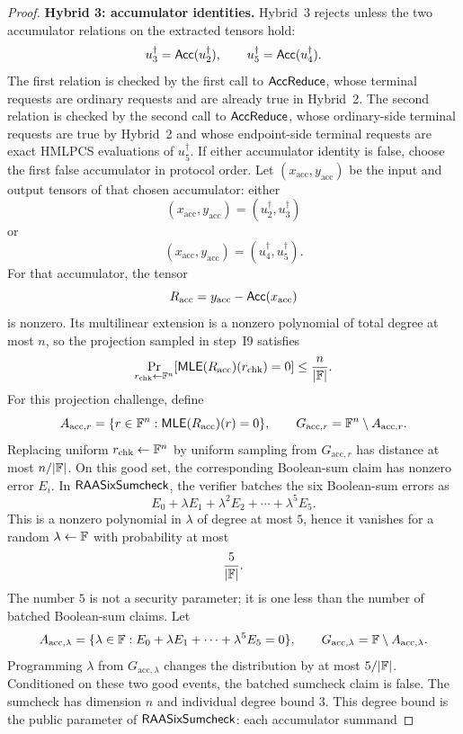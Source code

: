 \begin{proof}
\smallskip\noindent\textbf{Hybrid 3: accumulator identities.}
Hybrid~3 rejects unless the two accumulator relations on the extracted tensors
hold:
\[
  u_3^\dagger=\mathsf{Acc}(u_2^\dagger),
  \qquad
  u_5^\dagger=\mathsf{Acc}(u_4^\dagger).
\]
The first relation is checked by the first call to \(\mathsf{AccReduce}\), whose
terminal requests are ordinary requests and are already true in Hybrid~2.  The
second relation is checked by the second call to \(\mathsf{AccReduce}\), whose
ordinary-side terminal requests are true by Hybrid~2 and whose endpoint-side
terminal requests are exact HMLPCS evaluations of \(u_5^\dagger\).  If either
accumulator identity is false, choose the first false accumulator in protocol
order.  Let \((x_{\mathrm{acc}},y_{\mathrm{acc}})\) be the input and output
tensors of that chosen accumulator: either
\[
  (x_{\mathrm{acc}},y_{\mathrm{acc}})
  =
  (u_2^\dagger,u_3^\dagger)
\]
or
\[
  (x_{\mathrm{acc}},y_{\mathrm{acc}})
  =
  (u_4^\dagger,u_5^\dagger).
\]
For that accumulator, the tensor
\[
  R_{\mathrm{acc}}=y_{\mathrm{acc}}-\mathsf{Acc}(x_{\mathrm{acc}})
\]
is nonzero.  Its multilinear extension is a nonzero polynomial of total degree
at most \(n\), so the projection sampled in step~I9 satisfies
\[
  \Pr_{r_{\mathrm{chk}}\leftarrow\mathbb{F}^n}
  [\mathsf{MLE}(R_{\mathrm{acc}})(r_{\mathrm{chk}})=0]
  \le \frac{n}{|\mathbb{F}|}.
\]
For this projection challenge, define
\[
  A_{\mathrm{acc},r}
  =
  \{r\in\mathbb{F}^n:\mathsf{MLE}(R_{\mathrm{acc}})(r)=0\},
  \qquad
  G_{\mathrm{acc},r}
  =
  \mathbb{F}^n\setminus A_{\mathrm{acc},r}.
\]
Replacing uniform \(r_{\mathrm{chk}}\leftarrow\mathbb{F}^n\) by uniform sampling from
\(G_{\mathrm{acc},r}\) has distance at most \(n/|\mathbb{F}|\).  On this good set, the
corresponding Boolean-sum claim has nonzero error \(E_i\).  In
\(\mathsf{RAASixSumcheck}\), the verifier batches the six Boolean-sum errors as
\[
  E_0+\lambda E_1+\lambda^2E_2+\cdots+\lambda^5E_5.
\]
This is a nonzero polynomial in \(\lambda\) of degree at most \(5\), hence it
vanishes for a random \(\lambda\leftarrow\mathbb{F}\) with probability at most
\[
  \frac{5}{|\mathbb{F}|}.
\]
The number \(5\) is not a security parameter; it is one less than the number of
batched Boolean-sum claims.
Let
\[
  A_{\mathrm{acc},\lambda}
  =
  \{\lambda\in\mathbb{F}:
    E_0+\lambda E_1+\cdots+\lambda^5E_5=0\},
  \qquad
  G_{\mathrm{acc},\lambda}
  =
  \mathbb{F}\setminus A_{\mathrm{acc},\lambda}.
\]
Programming \(\lambda\) from \(G_{\mathrm{acc},\lambda}\) changes the
distribution by at most \(5/|\mathbb{F}|\).  Conditioned on these two good events, the
batched sumcheck claim is false.  The
sumcheck has dimension \(n\) and individual degree bound \(3\).  This degree
bound is the public parameter of \(\mathsf{RAASixSumcheck}\): each accumulator summand

\end{proof}
